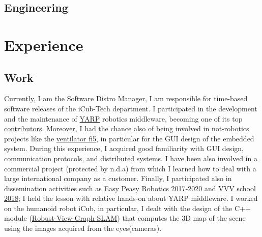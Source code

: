 \documentclass[10pt,a4paper]{moderncv}
\begin{document}
\subsection{Engineering}
\newpage
\section{Experience}
\subsection{Work}
{
Currently, I am the Software Distro Manager, I am responsible for time-based software releases of the iCub-Tech department.
I participated in the development and the maintenance of \href{https://github.com/robotology/yarp}{YARP} robotics middleware, becoming one
of its top \href{https://github.com/robotology/yarp/graphs/contributors}{contributors}.
Moreover, I had the chance also of being involved in not-robotics projects like the \href{https://github.com/icub-tech-iit/ventilator-fi5}{ventilator fi5}, in particular for the GUI design of the embedded system.
During this experience, I acquired good familiarity with GUI design, communication protocols, and distributed systems. I have been also involved in a commercial project (protected by n.d.a) from which I learned how to deal with a large international company as a customer.
Finally, I participated also in dissemination activities such as \href{https://easy-peasy-robotics.github.io/editions/mfr17/course-program.html}{Easy Peasy Robotics 2017}-\href{https://easy-peasy-robotics.github.io/editions/web20/course-program.html}{2020}
and \href{http://www.icub.org/school/2018}{VVV school 2018}; I held the lesson with relative hands-on about YARP middleware.}
{I worked on the humanoid robot iCub, in particular, I dealt with the design of the C++ module (\href{https://github.com/robotology-playground/Robust-View-Graph-SLAM}{Robust-View-Graph-SLAM}) that computes the 3D map of the scene using the images acquired from the eyes(cameras).}
\end{document}
